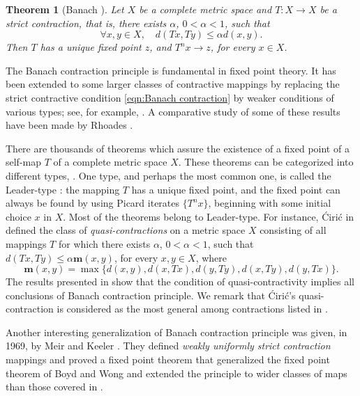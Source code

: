 \documentclass[a4paper,10pt,twoside,reqno]{amsart}
\newtheorem{thm}{Theorem}[section]
\theoremstyle{definition}
\theoremstyle{remark}
\newcommand{\set}[1]{\{#1\}}
\newcommand{\al}{\alpha}
\newcommand{\m}{\mathbf{m}}
\numberwithin{equation}{section}
\begin{document}
\begin{thm}[Banach \cite{Banach}]
\label{thm:Banach}
  Let $X$ be a complete metric space and $T:X\to X$ be a strict contraction,
  that is, there exists $\al$, $0<\al<1$, such that
  \begin{equation}\label{eqn:Banach contraction}
    \forall x,y\in X,\quad d(Tx,Ty) \leq \al d(x,y).
  \end{equation}
  Then $T$ has a unique fixed point $z$, and $T^nx\to z$, for every $x\in X$.
\end{thm}

The Banach contraction principle is fundamental in fixed point theory.
It has been extended to some larger classes of contractive mappings
by replacing the strict contractive condition \eqref{eqn:Banach contraction}
by weaker conditions of various types;  see, for example,
\cite{Boyd-Wong-1969,
Kannan-1969,
Singh-1969,
Ciric-1971,
Bianchini-1972,
Sehgal-1972,
Chatterjea-1972,
Hardy-Rogers-1973,
Ciric-1974,
Caristi-1976,
Ekeland-1974,
Subrahmanyam-1974,
Ciric-1981}.
A comparative study of some of these results have been made
by Rhoades \cite{Rhoades-1977}.

There are thousands of theorems which assure the existence of a fixed point of
a self-map $T$ of a complete metric space $X$. These theorems can be categorized
into different types, \cite{Suzuki-new-type-of-fp-thm-2009}. One type, and perhaps
the most common one, is called the Leader-type \cite{Leader-1983}: the mapping $T$
has a unique fixed point, and the fixed point can always be found by using
Picard iterates $\set{T^nx}$, beginning with some initial choice $x$ in $X$.
Most of the theorems belong to Leader-type.
For instance, \'Ciri\'c in \cite{Ciric-1974} defined the class of \emph{quasi-contractions}
on a metric space $X$ consisting of all mappings $T$ for which there
exists $\al$, $0<\al<1$, such that $d(Tx, Ty) \leq \al \m(x,y)$, for every $x,y\in X$, where
\begin{equation*}%
  \m(x,y)=\max\set{d(x, y), d(x, Tx), d(y, Ty), d(x, Ty), d(y, Tx)}.
\end{equation*}
The results presented in \cite{Ciric-1974} show that the condition of
quasi-contractivity implies all conclusions of Banach contraction principle.
We remark that \'Ciri\'c's quasi-contraction is considered as the most general
among contractions listed in \cite{Rhoades-1977}.

Another interesting generalization of Banach contraction principle was
given, in 1969, by Meir and Keeler \cite{Meir-Keeler-1969}.
They defined \emph{weakly uniformly strict contraction} mappings and proved
a fixed point theorem that generalized the fixed point theorem of Boyd and Wong \cite{Boyd-Wong-1969}
and extended the principle to wider classes of maps than those covered in \cite{Rhoades-1977}.
\end{document}
